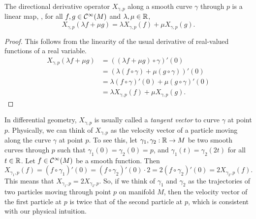 \begin{proposition}
    The directional derivative operator \(X_{\gamma, p}\) along a smooth curve \(\gamma\) through \(p\) is a linear map, \ie, for all \(f, g \in \mathcal C^\infty(M)\) and \(\lambda, \mu \in \mathbb R\),
    \begin{equation}
        X_{\gamma, p}(\lambda f + \mu g) = \lambda X_{\gamma, p}(f) + \mu X_{\gamma, p}(g).
    \end{equation}
\end{proposition}
\begin{proof}
    This follows from the linearity of the usual derivative of real-valued functions of a real variable.
    \begin{align*}
        X_{\gamma, p}(\lambda f + \mu g) & = ((\lambda f + \mu g) \circ \gamma)'(0)                  \\
                                         & = (\lambda (f \circ \gamma) + \mu (g \circ \gamma))'(0)   \\
                                         & = \lambda (f \circ \gamma)'(0) + \mu (g \circ \gamma)'(0) \\
                                         & = \lambda X_{\gamma, p}(f) + \mu X_{\gamma, p}(g).
    \end{align*}
\end{proof}
In differential geometry, \(X_{\gamma, p}\) is usually called a \emph{tangent vector} to curve \(\gamma\) at point \(p\). Physically, we can think of \(X_{\gamma, p}\) as the velocity vector of a particle moving along the curve \(\gamma\) at point \(p\). To see this, let \(\gamma_1, \gamma_2: \mathbb R \to M\) be two smooth curves through \(p\) such that \(\gamma_1(0) = \gamma_2(0) = p\), and \(\gamma_1(t) = \gamma_2(2 t)\) for all \(t \in \mathbb R\). Let \(f \in \mathcal C^\infty(M)\) be a smooth function. Then
\begin{equation}
    X_{\gamma_1, p}(f) = (f \circ \gamma_1)'(0) = (f \circ \gamma_2)'(0) \cdot 2 = 2 (f \circ \gamma_2)'(0) = 2 X_{\gamma_2, p}(f).
\end{equation}
This means that \(X_{\gamma_1, p} = 2 X_{\gamma_2, p}\). So, if we think of \(\gamma_1\) and \(\gamma_2\) as the trajectories of two particles moving through point \(p\) on manifold \(M\), then the velocity vector of the first particle at \(p\) is twice that of the second particle at \(p\), which is consistent with our physical intuition.

